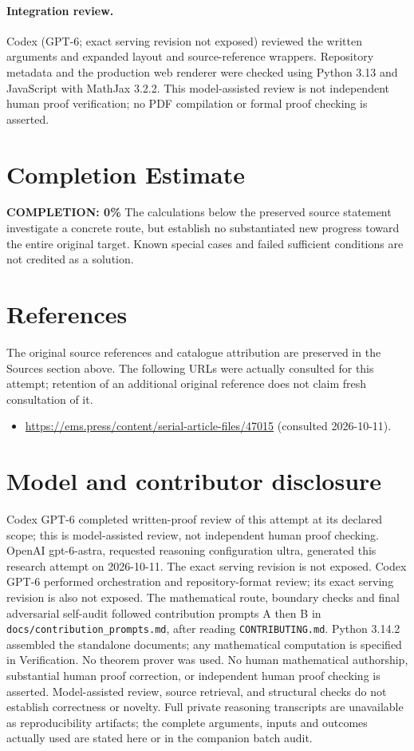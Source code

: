 \documentclass[11pt]{article}
\begin{document}
\paragraph{Integration review.} Codex (GPT-6; exact serving revision not exposed) reviewed the written arguments and expanded layout and source-reference wrappers. Repository metadata and the production web renderer were checked using Python 3.13 and JavaScript with MathJax 3.2.2. This model-assisted review is not independent human proof verification; no PDF compilation or formal proof checking is asserted.

\section{Completion Estimate}
\noindent\textbf{COMPLETION: 0\%}
The calculations below the preserved source statement investigate a concrete route,
but establish no substantiated new progress toward the entire original target.
Known special cases and failed sufficient conditions are not credited as a solution.
\section{References}
The original source references and catalogue attribution are preserved in the
Sources section above. The following URLs were actually consulted for this attempt;
retention of an additional original reference does not claim fresh consultation of it.
\begin{itemize}
\item \url{https://ems.press/content/serial-article-files/47015} (consulted 2026-10-11). 
\end{itemize}
\section{Model and contributor disclosure}
Codex GPT-6 completed written-proof review of this attempt at its declared scope; this is model-assisted review, not independent human proof checking.
OpenAI gpt-6-astra, requested reasoning configuration ultra, generated this research
attempt on 2026-10-11. The exact serving revision is not exposed. Codex GPT-6
performed orchestration and repository-format review; its exact serving revision
is also not exposed. The mathematical route, boundary checks and final adversarial
self-audit followed contribution prompts A then B in
\texttt{docs/contribution\_prompts.md}, after reading \texttt{CONTRIBUTING.md}.
Python 3.14.2 assembled the standalone documents; any mathematical computation is
specified in Verification. No theorem prover was used. No human mathematical
authorship, substantial human proof correction, or independent human proof checking
is asserted. Model-assisted review, source retrieval, and structural checks do not
establish correctness or novelty. Full private reasoning transcripts are unavailable
as reproducibility artifacts; the complete arguments, inputs and outcomes actually
used are stated here or in the companion batch audit.
\end{document}
